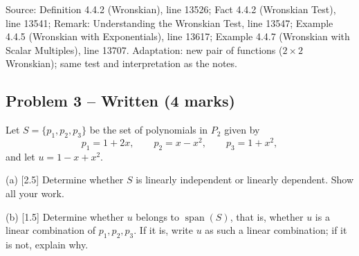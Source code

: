 \documentclass[11pt,a4paper]{article}
\newcommand{\Src}[1]{{\footnotesize\color{black!65}Source: #1}}
\begin{document}
\Src{Definition 4.4.2 (Wronskian), line 13526; Fact 4.4.2 (Wronskian Test), line 13541; Remark: Understanding the Wronskian Test, line 13547; Example 4.4.5 (Wronskian with Exponentials), line 13617; Example 4.4.7 (Wronskian with Scalar Multiples), line 13707. Adaptation: new pair of functions ($2\times2$ Wronskian); same test and interpretation as the notes.}\par
\subsection*{Problem 3 -- Written (4 marks)}
Let $S=\{p_1,p_2,p_3\}$ be the set of polynomials in $P_2$ given by\[p_1=1+2x,\qquad p_2=x-x^{2},\qquad p_3=1+x^{2},\]and let $u=1-x+x^{2}$.\par (a) [2.5] Determine whether $S$ is linearly independent or linearly dependent. Show all your work.\par (b) [1.5] Determine whether $u$ belongs to $\operatorname{span}(S)$, that is, whether $u$ is a linear combination of $p_1,p_2,p_3$. If it is, write $u$ as such a linear combination; if it is not, explain why.\par
\end{document}
